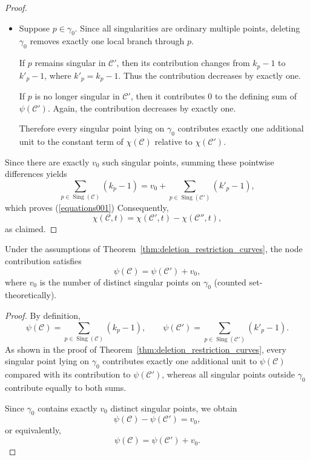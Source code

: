 \documentclass[article,11pt]{amsart} \numberwithin{equation}{section}
\numberwithin{equation}{section}
\begin{document}
{\begin{proof}
\begin{itemize}
		\item Suppose $p\in\gamma_0$. Since all singularities are ordinary multiple points, deleting $\gamma_0$ removes exactly one local branch through $p$.
		
		If $p$ remains singular in $\mathcal C'$, then its contribution changes from $k_p-1$ to $k'_p-1$, where $k'_p=k_p-1$. Thus the contribution decreases by exactly one.
		
		If $p$ is no longer singular in $\mathcal C'$, then it contributes $0$ to the defining sum of $\psi(\mathcal C')$. Again, the contribution decreases by exactly one.
		
		Therefore every singular point lying on $\gamma_0$ contributes exactly one additional unit to the constant term of $\chi(\mathcal C)$ relative to $\chi(\mathcal C')$.
	\end{itemize}
	
	Since there are exactly $v_0$ such singular points, summing these pointwise differences yields
	\[
	\sum_{p\in\operatorname{Sing}(\mathcal C)} (k_p-1)
	=
	v_0 + \sum_{p\in\operatorname{Sing}(\mathcal C')} (k'_p-1),
	\]
	which proves (\ref{equations001}) Consequently,
	\[
	\chi(\mathcal C,t) = \chi(\mathcal C',t)-\chi(\mathcal C'',t),
	\]
	as claimed.
\end{proof}

\begin{cor}
	\label{cor:psi_recursive}
	Under the assumptions of Theorem~\ref{thm:deletion_restriction_curves},
	the node contribution satisfies
	\[
	\psi(\mathcal C) = \psi(\mathcal C') + v_0,
	\]
	where $v_0$ is the number of distinct singular points on $\gamma_0$
	(counted set-theoretically).
\end{cor}

\begin{proof}
	By definition,
	\[
	\psi(\mathcal C) = \sum_{p\in\operatorname{Sing}(\mathcal C)} (k_p-1), \qquad
	\psi(\mathcal C') = \sum_{p\in\operatorname{Sing}(\mathcal C')} (k'_p-1).
	\]
	As shown in the proof of Theorem~\ref{thm:deletion_restriction_curves},
	every singular point lying on $\gamma_0$ contributes exactly one additional unit to $\psi(\mathcal C)$ compared with its contribution to $\psi(\mathcal C')$, whereas all singular points outside $\gamma_0$ contribute equally to both sums.
	
	Since $\gamma_0$ contains exactly $v_0$ distinct singular points, we obtain
	\[
	\psi(\mathcal C)-\psi(\mathcal C') = v_0,
	\]
	or equivalently,
	\[
	\psi(\mathcal C) = \psi(\mathcal C') + v_0.
	\]
\end{proof}

}
\end{document}
